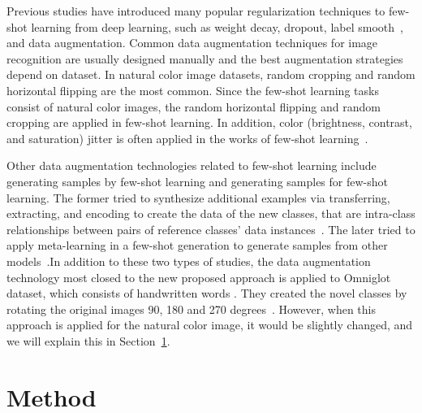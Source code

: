 \documentclass[10pt,twocolumn,letterpaper]{article}
\begin{document}
Previous studies have introduced many popular regularization techniques to few-shot learning from deep learning, such as weight decay, dropout, label smooth~\cite{bertinetto2018meta}, and data augmentation. Common data augmentation techniques for image recognition are usually designed manually and the best augmentation strategies depend on dataset. In natural color image datasets, random cropping and random horizontal flipping are the most common. Since the few-shot learning tasks consist of natural color images, the random horizontal flipping and random cropping are applied in few-shot learning. In addition, color (brightness, contrast, and saturation) jitter is often applied in the works of few-shot learning~\cite{gidaris2018dynamic,qiao2018few}.

Other data augmentation technologies related to few-shot learning include generating samples by few-shot learning and generating samples for few-shot learning. The former tried to synthesize additional examples via transferring, extracting, and encoding to create the data of the new classes, that are intra-class relationships between pairs of reference classes' data instances~\cite{hariharan2017low,schwartz2018delta}. The later tried to apply meta-learning in a few-shot generation to generate samples from other models~\cite{antoniou2017data}.In addition to these two types of studies, the data augmentation technology most closed to the new proposed approach is applied to Omniglot dataset, which consists of handwritten words \cite{lake2015human}. They created the novel classes by rotating the original images 90, 180 and 270 degrees~\cite{santoro2016meta}. However, when this approach is applied  for the natural color image, it would be slightly changed, and we will explain this in Section~\ref{Method}.

\section{Method}\label{Method}
\end{document}
